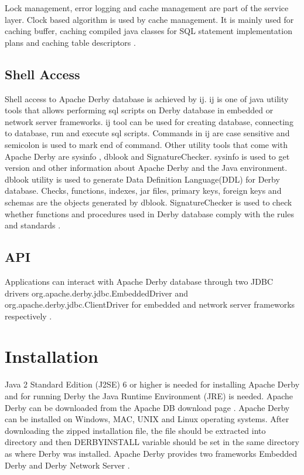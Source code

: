 \documentclass[9pt,twocolumn,twoside]{../../styles/osajnl}
\begin{document}
Lock management, error logging and cache management are part of the
service layer. Clock based algorithm is used by cache management. It
is mainly used for caching buffer, caching compiled java classes for
SQL statement implementation plans and caching table descriptors
\cite{www-derbyarch}.

\subsection{Shell Access}


Shell access to Apache Derby database is achieved by ij. ij is one of
java utility tools that allows performing sql scripts on Derby
database in embedded or network server frameworks. ij tool can be used
for creating database, connecting to database, run and execute sql
scripts.  Commands in ij are case sensitive and semicolon is used to
mark end of command.  Other utility tools that come with Apache Derby
are sysinfo , dblook and SignatureChecker. sysinfo is used to get
version and other information about Apache Derby and the Java
environment. dblook utility is used to generate Data Definition
Language(DDL) for Derby database. Checks, functions, indexes, jar
files, primary keys, foreign keys and schemas are the objects
generated by dblook.  SignatureChecker is used to check whether
functions and procedures used in Derby database comply with the rules
and standards \cite{www-derbyutil}.

\subsection{API}

Applications can interact with Apache Derby database through two JDBC
drivers org.apache.derby.jdbc.EmbeddedDriver and
org.apache.derby.jdbc.ClientDriver for embedded and network server
frameworks respectively \cite{www-derbyutil}.



\section {Installation}

Java 2 Standard Edition (J2SE) 6 or higher is needed for installing
Apache Derby and for running Derby the Java Runtime Environment (JRE)
is needed. Apache Derby can be downloaded from the Apache DB download
page \cite {www-derbydownload}. Apache Derby can be installed on
Windows, MAC, UNIX and Linux operating systems. After downloading the
zipped installation file, the file should be extracted into directory
and then DERBY\textunderscore INSTALL variable should be set in the
same directory as where Derby was installed. Apache Derby provides two
frameworks Embedded Derby and Derby Network Server \cite
{www-derbytutorial}.
\end{document}
